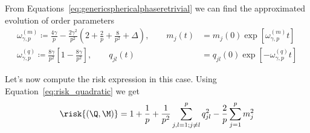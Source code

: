 From Equations~\eqref{eq:genericsphericalphaseretrivial} we can find the approximated evolution of order parameters
\[\begin{split}
  \omega^{(m)}_{\gamma,p} \coloneqq \frac{4 \gamma}{p} -\frac{2 \gamma^2}{p^2} \left(2 +\frac{2}{p} + \frac{8}{p^2} + \Delta \right), \qquad
  m_j{(t)} &= m_j{(0)} \exp\left[\omega^{(m)}_{\gamma,p}t\right] \\
  \omega^{(q)}_{\gamma,p} \coloneqq \frac{8 \gamma}{p^2} \left[1-\frac{8\gamma}{p^2}\right], \qquad
  q_{jl}{(t)} &= q_{jl}{(0)} \exp\left[-\omega^{(q)}_{\gamma,p}t\right]
\end{split}\]

Let's now compute the risk expression in this case. Using Equation~\eqref{eq:risk_quadratic} we get
\[
  \risk{(\Q,\M)} = 1 + \frac1p + \frac{1}{p^2}\sum_{j,l=1;j\neq l}^p q^2_{jl} - \frac2p \sum_{j=1}^p m^2_{j}
\]

